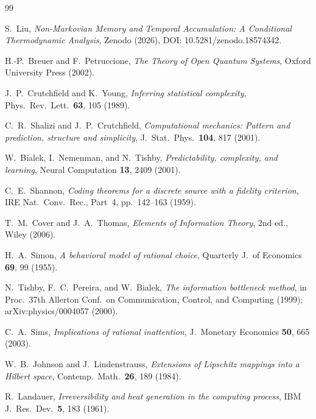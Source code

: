 \documentclass[12pt]{article}
\begin{document}
\begin{thebibliography}{99}

S.~Liu, \emph{Non-Markovian Memory and Temporal Accumulation: A Conditional Thermodynamic Analysis}, Zenodo (2026), DOI: 10.5281/zenodo.18574342.

H.-P.~Breuer and F.~Petruccione,
\emph{The Theory of Open Quantum Systems},
Oxford University Press (2002).

J.~P.~Crutchfield and K.~Young,
\emph{Inferring statistical complexity},
Phys.\ Rev.\ Lett.\ \textbf{63}, 105 (1989).

C.~R.~Shalizi and J.~P.~Crutchfield,
\emph{Computational mechanics: Pattern and prediction,
structure and simplicity},
J.\ Stat.\ Phys.\ \textbf{104}, 817 (2001).

W.~Bialek, I.~Nemenman, and N.~Tishby,
\emph{Predictability, complexity, and learning},
Neural Computation \textbf{13}, 2409 (2001).

C.~E.~Shannon,
\emph{Coding theorems for a discrete source with a
fidelity criterion},
IRE Nat.\ Conv.\ Rec., Part~4, pp.~142--163 (1959).

T.~M.~Cover and J.~A.~Thomas,
\emph{Elements of Information Theory},
2nd ed., Wiley (2006).

H.~A.~Simon,
\emph{A behavioral model of rational choice},
Quarterly J.\ of Economics \textbf{69}, 99 (1955).

N.~Tishby, F.~C.~Pereira, and W.~Bialek,
\emph{The information bottleneck method},
in Proc.\ 37th Allerton Conf.\ on Communication, Control,
and Computing (1999); arXiv:physics/0004057 (2000).

C.~A.~Sims,
\emph{Implications of rational inattention},
J.\ Monetary Economics \textbf{50}, 665 (2003).

W.~B.~Johnson and J.~Lindenstrauss,
\emph{Extensions of Lipschitz mappings into a Hilbert space},
Contemp.\ Math.\ \textbf{26}, 189 (1984).

R.~Landauer,
\emph{Irreversibility and heat generation in the
computing process},
IBM J.\ Res.\ Dev.\ \textbf{5}, 183 (1961).


\end{thebibliography}
\end{document}
